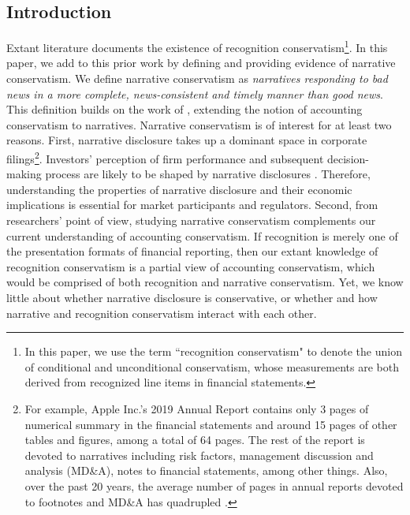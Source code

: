 \documentclass[a4paper]{article}
\begin{document}
\begin{spacing}{2}
\setcounter{page}{1}
\section{Introduction}
Extant literature documents the existence of recognition conservatism\footnote{In this paper, we use the term ``recognition conservatism" to denote the union of conditional and unconditional conservatism, whose measurements are both derived from recognized line items in financial statements.}. In this paper, we add to this prior work by defining and providing evidence of narrative conservatism. We define narrative conservatism as \textit{narratives responding to bad news in a more complete, news-consistent and timely manner than good news}. This definition builds on the work of \citet*{basuConservatismPrincipleAsymmetric1997}, extending the notion of accounting conservatism to narratives. Narrative conservatism is of interest for at least two reasons. First, narrative disclosure takes up a dominant space in corporate filings\footnote{For example, Apple Inc.'s 2019 Annual Report contains only 3 pages of numerical summary in the financial statements and around 15 pages of other tables and figures, among a total of 64 pages. The rest of the report is devoted to narratives including risk factors, management discussion and analysis (MD\&A), notes to financial statements, among other things. Also, over the past 20 years, the average number of pages in annual reports devoted to footnotes and MD\&A has quadrupled \citep{eyPointNowTime2012}.}. Investors' perception of firm performance and subsequent decision-making process are likely to be shaped by narrative disclosures \citep*{liTextualAnalysisCorporate2010}. Therefore, understanding the properties of narrative disclosure and their economic implications is essential for market participants and regulators. Second, from researchers' point of view, studying narrative conservatism complements our current understanding of accounting conservatism. If recognition is merely one of the presentation formats of financial reporting, then our extant knowledge of recognition conservatism is a partial view of accounting conservatism, which would be comprised of both recognition and narrative conservatism. Yet, we know little about whether narrative disclosure is conservative, or whether and how narrative and recognition conservatism interact with each other.


\end{spacing}
\end{document}
